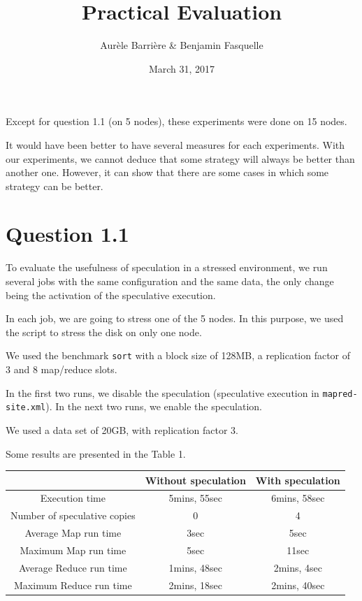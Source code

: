 \documentclass{article}
\author{Aur\`ele Barri\`ere \& Benjamin Fasquelle}
\title{Practical Evaluation}
\date{March 31, 2017}
\def\file#1{\texttt{#1}}
\def\bench#1{\texttt{#1}}
\begin{document}
\maketitle

Except for question 1.1 (on 5 nodes), these experiments were done on 15 nodes.

It would have been better to have several measures for each experiments. With our experiments, we cannot deduce that some strategy will always be better than another one. However, it can show that there are some cases in which some strategy can be better.

\section*{Question 1.1}
To evaluate the usefulness of speculation in a stressed environment, we run several jobs with the same configuration and the same data, the only change being the activation of the speculative execution.

In each job, we are going to stress one of the 5 nodes. In this purpose, we used the script to stress the disk on only one node.

We used the benchmark \bench{sort} with a block size of 128MB, a replication factor of 3 and 8 map/reduce slots.

In the first two runs, we disable the speculation (speculative execution in \file{mapred-site.xml}).
In the next two runs, we enable the speculation.


We used a data set of 20GB, with replication factor 3.

Some results are presented in the Table 1.

\begin{center}
\begin{tabular}{|c|c|c|}
\hline
\ & Without speculation & With speculation \\
\hline
Execution time & 5mins, 55sec & 6mins, 58sec \\
\hline
Number of speculative copies & 0 & 4 \\
\hline
Average Map run time & 3sec & 5sec \\
\hline
Maximum Map run time & 5sec & 11sec \\
\hline
Average Reduce run time & 1mins, 48sec & 2mins, 4sec \\
\hline
Maximum Reduce run time & 2mins, 18sec & 2mins, 40sec \\
\hline
\end{tabular}
\end{center}
\end{document}
